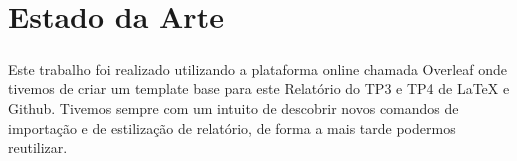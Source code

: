 \chapter*{\thechapter \quad Estado da Arte}
\paragraph{}
Este trabalho foi realizado utilizando a plataforma online chamada Overleaf onde tivemos de criar um template base para este Relatório do TP3 e TP4 de LaTeX e Github. 
Tivemos sempre com um intuito de descobrir novos comandos de importação e de estilização de relatório, de forma a mais tarde podermos reutilizar.



